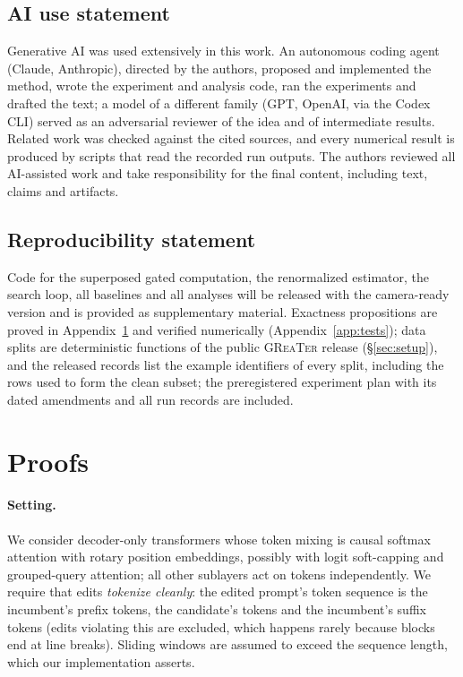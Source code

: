 \documentclass{article}
\newcommand{\greater}{\textsc{GReaTer}}
\begin{document}
\subsection*{AI use statement}
Generative AI was used extensively in this work. An autonomous coding agent (Claude, Anthropic),
directed by the authors, proposed and implemented the method, wrote the
experiment and analysis code, ran the experiments and drafted the text; a model of a
different family (GPT, OpenAI, via the Codex CLI) served as an adversarial reviewer
of the idea and of intermediate results. Related work was checked against the cited
sources, and every numerical result is produced by scripts that read the recorded
run outputs. The authors reviewed all AI-assisted work and take responsibility for
the final content, including text, claims and artifacts.

\subsection*{Reproducibility statement}
Code for the superposed gated computation, the renormalized estimator, the search
loop, all baselines and all analyses will be released with the camera-ready
version and is provided as supplementary material. Exactness propositions are
proved in Appendix~\ref{app:proofs} and verified numerically
(Appendix~\ref{app:tests}); data splits are deterministic functions of the public
\greater{} release (\S\ref{sec:setup}), and the released records list the example
identifiers of every split, including the rows used to form the clean subset; the
preregistered experiment plan with its dated amendments and all run records are
included.




\appendix
\section{Proofs}
\label{app:proofs}

\paragraph{Setting.} We consider decoder-only transformers whose token mixing is
causal softmax attention with rotary position embeddings, possibly with logit
soft-capping and grouped-query attention; all other sublayers act on tokens
independently. We require that edits \emph{tokenize cleanly}: the edited prompt's
token sequence is the incumbent's prefix tokens, the candidate's tokens and the
incumbent's suffix tokens (edits violating this are excluded, which happens rarely
because blocks end at line breaks). Sliding windows are assumed to exceed the
sequence length, which our implementation asserts.
\end{document}
